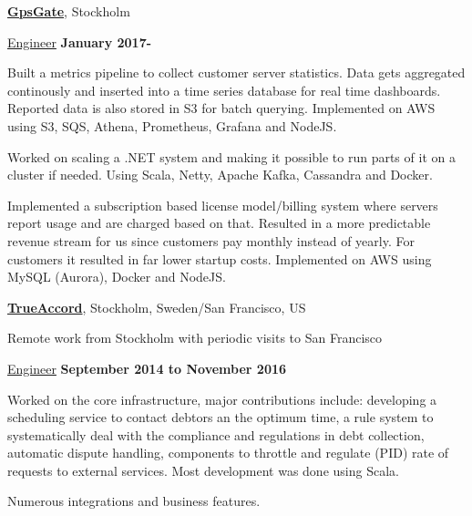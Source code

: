 \documentclass[10pt]{article}
\renewcommand\textit[1]{\underline{#1}}
\newcommand{\halfblankline}{\quad\vspace{-0.5\baselineskip}\pagebreak[3]}
\begin{document}
\href{http://gpsgate.com/}{\textbf{GpsGate}},
Stockholm

\begin{outerlist}
\item[] \textit{Engineer}
  \hfill \textbf{January 2017-}
  \begin{innerlist}
  \item
    Built a metrics pipeline to collect customer server statistics.
    Data gets aggregated continously and inserted into a time series database
    for real time dashboards. Reported data is also stored in S3 for batch
    querying.
    Implemented on AWS using S3, SQS, Athena, Prometheus, Grafana and NodeJS.
  \item
    Worked on scaling a .NET system and making it possible to run parts of it on
    a cluster if needed. Using Scala, Netty, Apache Kafka, Cassandra and Docker.
  \item
    Implemented a subscription based license model/billing system where servers
    report usage and are charged based on that. Resulted in a more predictable
    revenue stream for us since customers pay monthly instead of yearly. For
    customers it resulted in far lower startup costs.
    Implemented on AWS using MySQL (Aurora), Docker and NodeJS.
  \end{innerlist}
\end{outerlist}

\halfblankline

\href{http://www.trueaccord.com/}{\textbf{TrueAccord}},
Stockholm, Sweden/San Francisco, US

Remote work from Stockholm with periodic visits to San Francisco
\begin{outerlist}
\item[] \textit{Engineer}
  \hfill \textbf{September 2014 to November 2016}
  \begin{innerlist}
  \item
      Worked on the core infrastructure, major contributions include:
      developing a scheduling service to contact debtors an the optimum time,
      a rule system to systematically deal with the compliance and regulations
      in debt collection, automatic dispute handling, components to throttle
      and regulate (PID) rate of requests to external services.
      Most development was done using Scala.
    \item
      Numerous integrations and business features.
  \end{innerlist}
\end{outerlist}
\end{document}
